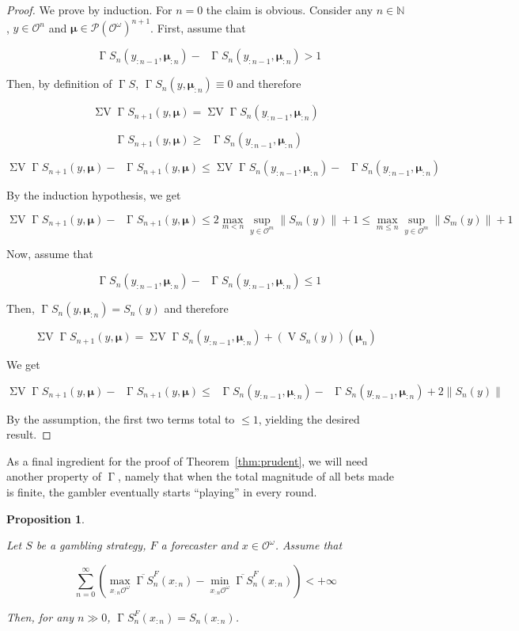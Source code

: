 \documentclass[11pt]{article}
\theoremstyle{definition}
\theoremstyle{plain}
\newtheorem{proposition}{Proposition}%
\newcommand{\Nats}{\mathbb{N}}
\newcommand{\N}[1]{\lVert #1 \rVert}
\newcommand{\PM}{\mathcal{P}}
\newcommand{\Ob}{\mathcal{O}}
\newcommand{\OO}{\Ob^\omega}
\newcommand{\PMO}{\PM(\OO)}
\DeclareMathOperator{\V}{V}
\DeclareMathOperator{\SV}{\Sigma V}
\DeclareMathOperator{\SVM}{\Sigma V_{\min}}
\DeclareMathOperator{\SVX}{\Sigma V_{\max}}
\DeclareMathOperator{\PG}{\Gamma}
\newcommand{\BM}{\bm{\mu}}
\begin{document}
\begin{proof}

We prove by induction. For $n=0$ the claim is obvious. Consider any ${n \in \Nats}$, $y \in \Ob^{n}$ and $\BM \in \PMO^{n+1}$. First, assume that

$$\SVX \PG{S}_n(y_{:n-1},\BM_{:n}) - \SVM \PG{S}_n(y_{:n-1},\BM_{:n}) > 1$$

Then, by definition of ${\PG{S}}$, ${\PG{S}_n}(y,\BM_{:n}) \equiv 0$ and therefore

$$\SV \PG{S}_{n+1}(y,\BM)=\SV \PG{S}_n(y_{:n-1},\BM_{:n})$$

$$\SVM \PG{S}_{n+1}(y,\BM) \geq \SVM \PG{S}_n(y_{:n-1},\BM_{:n})$$

$$\SV \PG{S}_{n+1}(y,\BM) - \SVM \PG{S}_{n+1}(y,\BM) \leq \SV \PG{S}_n(y_{:n-1},\BM_{:n}) - \SVM \PG{S}_n(y_{:n-1},\BM_{:n}) $$

By the induction hypothesis, we get

$$\SV \PG{S}_{n+1}(y,\BM) - \SVM \PG{S}_{n+1}(y,\BM) \leq  2 \max_{m < n} \sup_{y \in \Ob^m} \N{S_m(y)}  + 1 \leq \max_{m \leq n} \sup_{y \in \Ob^m} \N{S_m(y)}  + 1$$

Now, assume that 

$$\SVX \PG{S}_n(y_{:n-1},\BM_{:n}) - \SVM \PG{S}_n(y_{:n-1},\BM_{:n}) \leq 1$$

Then, ${\PG{S}_n}(y,\BM_{:n}) = {S_n}(y)$ and therefore

$$\SV \PG{S}_{n+1}(y,\BM)=\SV \PG{S}_n(y_{:n-1},\BM_{:n}) + (\V{S}_n(y))(\BM_n)$$

We get

$$\SV \PG{S}_{n+1}(y,\BM) - \SVM \PG{S}_{n+1}(y,\BM) \leq \SVX \PG{S}_n(y_{:n-1},\BM_{:n}) - \SVM \PG{S}_n(y_{:n-1},\BM_{:n}) + 2 \N{S_n(y)}$$

By the assumption, the first two terms total to ${\leq 1}$, yielding the desired result.
\end{proof}

As a final ingredient for the proof of Theorem~\ref{thm:prudent}, we will need another property of $\PG$, namely that when the total magnitude of all bets made is finite, the gambler eventually starts \enquote{playing} in every round.

\begin{samepage}
\begin{proposition}
\label{prp:when_bounded_play}

Let $S$ be a gambling strategy, $F$ a forecaster and $x \in \OO$. Assume that

\begin{equation}
\sum_{n=0}^\infty {(\max_{x_{:n}\OO} \overline{\PG{S}}^F_n(x_{:n})-\min_{x_{:n}\OO} \overline{\PG{S}}^F_n(x_{:n}))} < +\infty
\end{equation}

Then, for any $n \gg 0$, $\PG{S}^F_n(x_{:n})=S_n(x_{:n})$.

\end{proposition}
\end{samepage}
\end{document}
